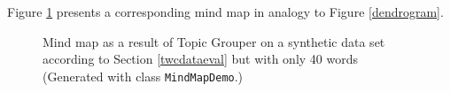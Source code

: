 \documentclass[10pt, a4paper, oneside]{article}
\begin{document}
Figure \ref{mindmap1} presents a corresponding mind map in analogy to Figure \ref{dendrogram}.
\begin{figure}
\caption{Mind map as a result of Topic Grouper on a synthetic data set according to Section \ref{twcdataeval} but with only 40 words (Generated with class \texttt{MindMapDemo}.)}
\label{mindmap1}
\end{figure}
\end{document}

